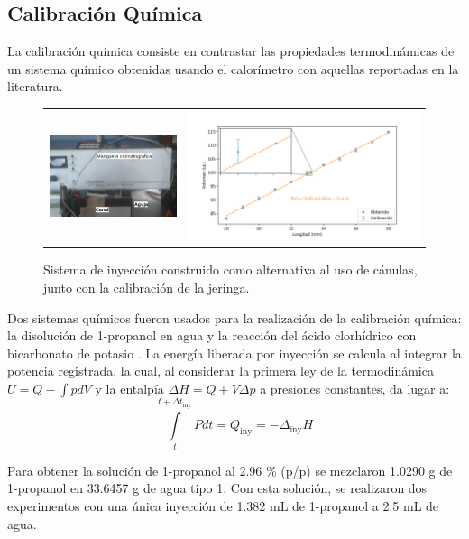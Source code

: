 \documentclass[a0]{sciposter}
\begin{document}
\begin{multicols}{3}
\section{Calibraci\'on Qu\'imica}
	La calibraci\'on qu\'imica consiste en contrastar las propiedades termodin\'amicas de un sistema qu\'imico obtenidas usando el calor\'imetro con aquellas reportadas en la literatura. 
	\begin{figure}[h]
		\centering
		\begin{tabular}{cc}
			\includegraphics[width=0.4\linewidth]{../Tesis/Figures/sistemaInyeccion} & 
			\includegraphics[width=0.6\linewidth]{../Data/Syringe/syringe_cal.png}
		\end{tabular}
		\caption{Sistema de inyección construido como alternativa al uso de cánulas, junto con la calibración de la jeringa.}
	\end{figure}

	Dos sistemas qu\'imicos fueron usados para la realizaci\'on de la calibraci\'on qu\'imica: la disoluci\'on de 1-propanol en agua y la reacci\'on del \'acido clorhídrico con bicarbonato de potasio \cite{demarse2011calibration, adao2012chemical, nanoitc}. La energía liberada por inyección se calcula al integrar la potencia registrada, la cual, al considerar la primera ley de la termodinámica $U = Q-\int pdV$ y la entalpía $\Delta H = Q + V\Delta p$ a presiones constantes, da lugar a:
	\begin{equation}
		\int\limits_t^{t+\Delta t_\text{iny}} Pdt = Q_\text{iny} = -\Delta_\text{iny}H
	\end{equation}
	
	Para obtener la soluci\'on de 1-propanol al 2.96 \% (p/p) se mezclaron 1.0290 g de 1-propanol en 33.6457 g de agua tipo 1. Con esta soluci\'on, se realizaron dos experimentos con una \'unica inyecci\'on de 1.382 mL de 1-propanol a 2.5 mL de agua.
	

\end{multicols}
\end{document}
